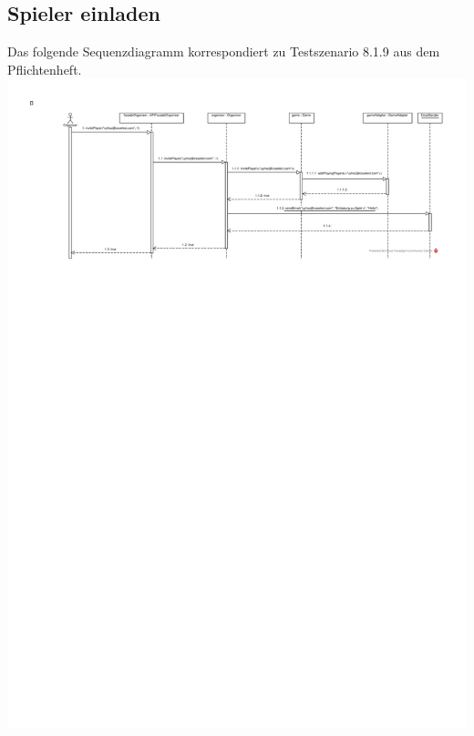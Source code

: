 \documentclass[a4paper]{scrreprt}
\begin{document}
	\subsection{Spieler einladen}
	Das folgende Sequenzdiagramm korrespondiert zu Testszenario 8.1.9 aus dem Pflichtenheft. \\
	\includegraphics[width=\textwidth]{img/Spieler_einladen.pdf}
\end{document}
